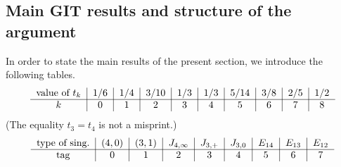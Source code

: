 \documentclass[11pt]{amsart}
\numberwithin{equation}{section}
\theoremstyle{plain}
\theoremstyle{remark}
\theoremstyle{definition}
\begin{document}
 \subsection{Main GIT results and structure of the argument} In order to state the main results of the present section, we introduce the following tables.
%
\begin{equation}\label{valori}
%
\begin{tabular}{c|c|c|c|c|c|c|c | c | c}
%
value of $t_k$ &  $1/6$ & $1/4$ &  $3/10$  & $1/3$ &  $1/3$ &   $5/14$ &   $3/8$ &  $2/5$ & $1/2$ \\
\hline
$k$  & $0$ & $1$  & $2$  & $3$  &  $4$  &  $5$  & $6$ & $7$ & $8$
\end{tabular}
%
\end{equation}
%
(The equality $t_3=t_4$ is not a misprint.)
%
\begin{equation}\label{posizione}
%
\begin{tabular}{c|c|c|c|c|c|c|c | c }
type of sing. &  $(4,0)$ & $(3,1)$ &  $J_{4,\infty}$  &   $J_{3,+}$ &   $J_{3,0}$ &   $E_{14}$ & 
 $E_{13}$ &   $E_{12}$ \\
\hline
tag  & $0$ & $1$  & $2$  & $3$  &  $4$  &  $5$  & $6$ & $7$ 
\end{tabular}
%
\end{equation}
%
\end{document}
